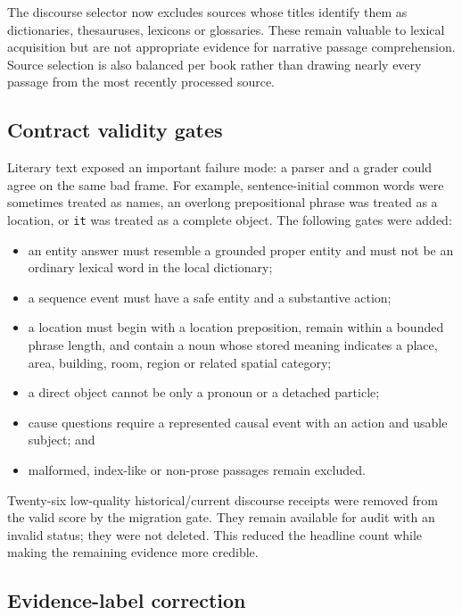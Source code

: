 \documentclass[11pt,a4paper]{article}
\begin{document}
The discourse selector now excludes sources whose titles identify them as dictionaries,
thesauruses, lexicons or glossaries. These remain valuable to lexical acquisition but are not
appropriate evidence for narrative passage comprehension. Source selection is also balanced per
book rather than drawing nearly every passage from the most recently processed source.

\subsection{Contract validity gates}

Literary text exposed an important failure mode: a parser and a grader could agree on the same bad
frame. For example, sentence-initial common words were sometimes treated as names, an overlong
prepositional phrase was treated as a location, or \texttt{it} was treated as a complete object.
The following gates were added:

\begin{itemize}
  \item an entity answer must resemble a grounded proper entity and must not be an ordinary
        lexical word in the local dictionary;
  \item a sequence event must have a safe entity and a substantive action;
  \item a location must begin with a location preposition, remain within a bounded phrase length,
        and contain a noun whose stored meaning indicates a place, area, building, room, region or
        related spatial category;
  \item a direct object cannot be only a pronoun or a detached particle;
  \item cause questions require a represented causal event with an action and usable subject; and
  \item malformed, index-like or non-prose passages remain excluded.
\end{itemize}

Twenty-six low-quality historical/current discourse receipts were removed from the valid score by
the migration gate. They remain available for audit with an invalid status; they were not deleted.
This reduced the headline count while making the remaining evidence more credible.

\subsection{Evidence-label correction}
\end{document}
